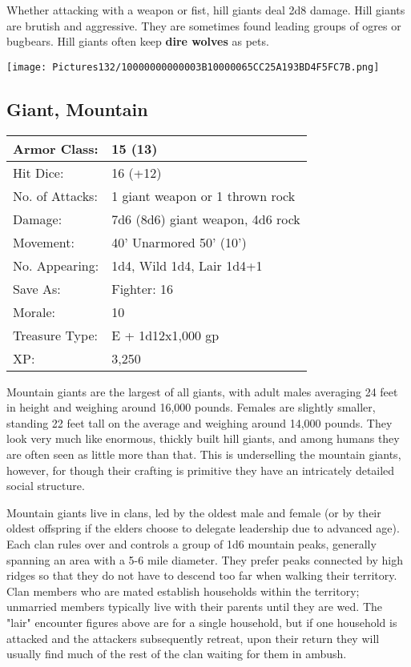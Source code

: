 \documentclass[a4paper,twoside,openany,10pt]{book}
\begin{document}
\begin{multicols}{2}
Whether attacking with a weapon or fist, hill giants deal 2d8 damage. Hill giants are brutish and aggressive. They are sometimes found leading groups of ogres or bugbears. Hill giants often keep \textbf{dire wolves} as pets.

\begin{center}
	\texttt{[image: Pictures132/10000000000003B10000065CC25A193BD4F5FC7B.png]}
\end{center}

\subsection*{Giant, Mountain}\label{giant-mountain}

\begin{tabularx}{0.48\textwidth}{@{}lX@{}}
Armor Class: & 15 (13) \\\hline
Hit Dice: & 16 (+12) \\\hline
No. of Attacks: & 1 giant weapon or 1 thrown rock \\\hline
Damage: & 7d6 (8d6) giant weapon, 4d6 rock \\\hline
Movement: & 40' Unarmored 50'
(10') \\\hline
No. Appearing: & 1d4, Wild 1d4, Lair 1d4+1 \\\hline
Save As: & Fighter: 16 \\\hline
Morale: & 10 \\\hline
Treasure Type: & E + 1d12x1,000 gp \\\hline
XP: & 3,250 \\\hline
\end{tabularx}\medskip

Mountain giants are the largest of all giants, with adult males averaging 24 feet in height and weighing around 16,000 pounds. Females are slightly smaller, standing 22 feet tall on the average and weighing around 14,000 pounds. They look very much like enormous, thickly built hill giants, and among humans they are often seen as little more than that. This is underselling the mountain giants, however, for though their crafting is primitive they have an intricately detailed social structure.

Mountain giants live in clans, led by the oldest male and female (or by their oldest offspring if the elders choose to delegate leadership due to advanced age). Each clan rules over and controls a group of 1d6 mountain peaks, generally spanning an area with a 5-6 mile diameter. They prefer peaks connected by high ridges so that they do not have to descend too far when walking their territory. Clan members who are mated establish households within the territory; unmarried members typically live with their parents until they are wed. The "lair" encounter figures above are for a single household, but if one household is attacked and the attackers subsequently retreat, upon their return they will usually find much of the rest of the clan waiting for them in ambush.


\end{multicols}
\end{document}
